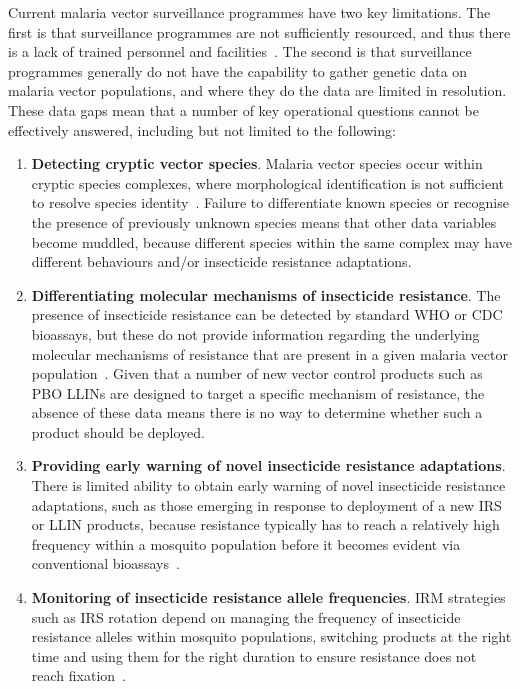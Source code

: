 \begin{refsection}
Current malaria vector surveillance programmes have two key limitations.
%
The first is that surveillance programmes are not sufficiently resourced, and thus there is a lack of trained personnel and facilities~\parencite{Russell2020}.
%
The second is that surveillance programmes generally do not have the capability to gather genetic data on malaria vector populations, and where they do the data are limited in resolution.
%
These data gaps mean that a number of key operational questions cannot be effectively answered, including but not limited to the following:
\begin{enumerate}
%
\item \textbf{Detecting cryptic vector species}. 
%
Malaria vector species occur within cryptic species complexes, where morphological identification is not sufficient to resolve species identity~\parencite{Davidson1964,Coetzee2013}. 
%
Failure to differentiate known species or recognise the presence of previously unknown species means that other data variables become muddled, because different species within the same complex may have different behaviours and/or insecticide resistance adaptations.
%
\item \textbf{Differentiating molecular mechanisms of insecticide resistance}.
%
The presence of insecticide resistance can be detected by standard WHO or CDC bioassays, but these do not provide information regarding the underlying molecular mechanisms of resistance that are present in a given malaria vector population~\parencite{WHO2018TPIRM}.
%
Given that a number of new vector control products such as PBO LLINs are designed to target a specific mechanism of resistance, the absence of these data means there is no way to determine whether such a product should be deployed.
%
\item \textbf{Providing early warning of novel insecticide resistance adaptations}.
%
There is limited ability to obtain early warning of novel insecticide resistance adaptations, such as those emerging in response to deployment of a new IRS or LLIN products, because resistance typically has to reach a relatively high frequency within a mosquito population before it becomes evident via conventional bioassays~\parencite{Roush1986,Sternberg2018}.
%
\item \textbf{Monitoring of insecticide resistance allele frequencies}.
%
IRM strategies such as IRS rotation depend on managing the frequency of insecticide resistance alleles within mosquito populations, switching products at the right time and using them for the right duration to ensure resistance does not reach fixation~\parencite{South2018}. 

\end{enumerate}
\end{refsection}
